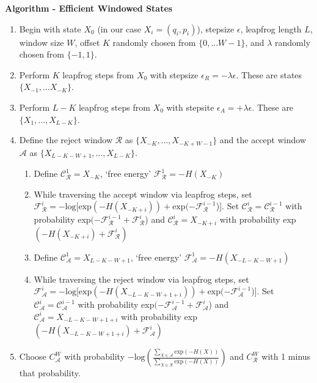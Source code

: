 \documentclass{article}
\numberwithin{equation}{section}
\begin{document}
\textbf{Algorithm - Efficient Windowed States}
\begin{enumerate}
\item Begin with state $X_0$ (in our case $X_i = (q_i,p_i)$), stepsize $\epsilon$, leapfrog length $L$, window size $W$, offset $K$ randomly chosen from $\{0,...W-1\}$, and $\lambda$ randomly chosen from $\{-1,1\}$.\\
\item Perform $K$ leapfrog steps from $X_0$ with stepsize $\epsilon_R = -\lambda\epsilon$. These are states $\{X_{-1},...X_{-K}\}$.\\
\item Perform $L-K$ leapfrog steps from $X_0$ with stepsite $\epsilon_A = +\lambda\epsilon$. These are $\{X_1,...,X_{L-K}\}$.\\
\item Define the reject window $\mathcal{R}$ as $\{X_{-K},...,X_{-K+W-1}\}$ and the accept window $\mathcal{A}$ as $\{X_{L-K-W+1},...,X_{L-K}\}$.\\
\begin{enumerate}
\item Define $\mathcal{C}_{\mathcal{R}}^1 = X_{-K}$, `free energy' $\mathcal{F}_{\mathcal{R}}^1 = -H(X_{-K})$\\
\item While traversing the accept window via leapfrog steps, set $\mathcal{F}_{\mathcal{R}}^{i} = -\text{log}[\text{exp}(-H(X_{-K+i})) + \text{exp}(-\mathcal{F}_{\mathcal{R}}^{i-1}$)]. Set $\mathcal{C}_{\mathcal{R}}^{i} = \mathcal{C}_{\mathcal{R}}^{i-1}$ with probability exp$(-\mathcal{F}_{\mathcal{R}}^{i-1} + \mathcal{F}_{\mathcal{R}}^{i}$) and $\mathcal{C}_{\mathcal{R}}^{i} =  X_{-K+i}$ with probability exp$(-H(X_{-K+i}) + \mathcal{F}_{\mathcal{R}}^{i})$
\item Define $\mathcal{C}_{\mathcal{A}}^1 = X_{L-K-W+1}$, `free energy' $\mathcal{F}_{\mathcal{A}}^1 = -H(X_{-L-K-W+1})$\\
\item While traversing the reject window via leapfrog steps, set $\mathcal{F}_{\mathcal{A}}^{i} = -\text{log}[\text{exp}(-H(X_{-L-K-W+1+i})) + \text{exp}(-\mathcal{F}_{\mathcal{A}}^{i-1}$)]. Set $\mathcal{C}_{\mathcal{A}}^{i} = \mathcal{C}_{\mathcal{A}}^{i-1}$ with probability exp$(-\mathcal{F}_{\mathcal{A}}^{i-1} + \mathcal{F}_{\mathcal{A}}^{i}$) and $\mathcal{C}_{\mathcal{A}}^{i} =  X_{-L-K-W+1+i}$ with probability exp$(-H(X_{-L-K-W+1+i}) + \mathcal{F}_{\mathcal{A}}^{i})$
\end{enumerate}
\item Choose $C^{W}_{\mathcal{A}}$ with probability $-\text{log}\left(\frac{\sum_{X\in\mathcal{A}}\text{exp}(-H(X))}{\sum_{X\in\mathcal{R}}\text{exp}(-H(X))}\right)$ and $C^{W}_{\mathcal{R}}$ with 1 minus that probability.
\end{enumerate}
\end{document}
